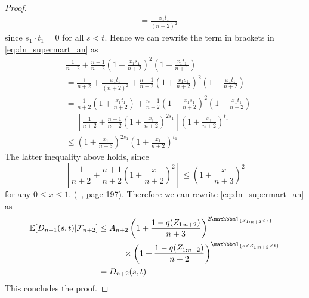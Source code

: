\begin{lemma}
\begin{proof}
\begin{align*}
		&= \frac{x_1t_1}{(n+2)^2}
		\end{align*}
		since $s_1\cdot t_1=0$ for all $s<t$. Hence we can rewrite the term in brackets in \eqref{eq:dn_supermart_an} as 
		\begin{align*}
		&\frac{1}{n+2} + \frac{n+1}{n+2}\left(1+\frac{x_1s_1}{n+2}\right)^{2} \left(1+\frac{x_1t_1}{n+1}\right) \\
		&=\frac{1}{n+2} + \frac{x_1t_1}{(n+2)^2} + \frac{n+1}{n+2}\left(1+\frac{x_1s_1}{n+2}\right)^{2}\left(1+\frac{x_1t_1}{n+2}\right)\\
		&=\frac{1}{n+2}\left(1+\frac{x_1t_1}{n+2}\right) + \frac{n+1}{n+2}\left(1+\frac{x_1s_1}{n+2}\right)^{2}\left(1+\frac{x_1t_1}{n+2}\right)\\
		&=\left[\frac{1}{n+2} + \frac{n+1}{n+2}\left(1+\frac{x_1}{n+2}\right)^{2s_1}\right]\left(1+\frac{x_1}{n+2}\right)^{t_1}\\
		&\leq \left(1+\frac{x_1}{n+3}\right)^{2s_1}\left(1+\frac{x_1}{n+2}\right)^{t_1}
		\end{align*}
		The latter inequality above holds, since 
		$$\left[\frac{1}{n+2} + \frac{n+1}{n+2}\left(1+\frac{x}{n+2}\right)^{2}\right] \leq \left(1+\frac{x}{n+3}\right)^{2}$$
		for any $0\leq x\leq 1$. (\cf\ \cite{bose1999strong}, page 197). Therefore we can rewrite \eqref{eq:dn_supermart_an} as
		\begin{align*}
		\E[D_{n+1}(s,t)| \F_{n+2}]	&\leq A_{n+2} \left(1+\frac{1-q(Z_{1:n+2})}{n+3}\right)^{2\I{Z_{1:n+2}<s}} \\
		&\qquad\quad \times \left(1+\frac{1-q(Z_{1:n+2})}{n+2}\right)^{\I{s<Z_{1:n+2} <t}}\\
		&= D_{n+2}(s,t)
		\end{align*}		
		This concludes the proof.
	\end{proof}
\end{lemma}
%
